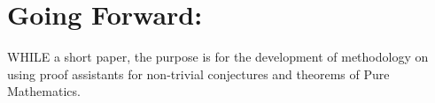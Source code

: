 \documentclass[10pt]{article}
\theoremstyle{plain}
\theoremstyle{definition}
\theoremstyle{remark}
\begin{document}
	\section{Going Forward:}
	\lettrine[lines=1, lhang=0.1, loversize=0.2]{W}HILE a short paper, the purpose is for the development of methodology on using proof assistants for non-trivial conjectures and theorems of Pure Mathematics.
	
\nocite{*}
	


	
	
\end{document}
